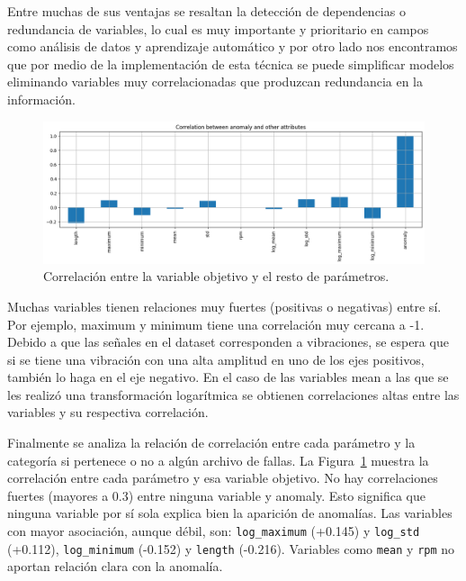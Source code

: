 \documentclass[11pt,a4paper,spanish]{book}
\numberwithin{equation}{chapter}
\numberwithin{figure}{chapter}
\begin{document}
Entre muchas de sus ventajas se resaltan la detección de dependencias o redundancia de 
variables, lo cual es muy importante y prioritario en campos como análisis de datos y 
aprendizaje automático y por otro lado nos encontramos que por medio de la implementación
de esta técnica se puede simplificar modelos eliminando variables muy correlacionadas que 
produzcan redundancia en la información. \cite{Alvarez2023}


\begin{figure}[h]
    \centering
    \includegraphics[width=1\textwidth]{media/dataset/corr-mat-target.png}
    \caption{Correlación entre la variable objetivo y el resto de parámetros.}
    \label{fig:figCorrMatTarget}
\end{figure}



Muchas variables tienen relaciones muy fuertes (positivas o negativas) entre sí. 
Por ejemplo,  maximum y minimum tiene una correlación muy cercana a -1. 
Debido a que las señales en el dataset corresponden a vibraciones, se espera que si se 
tiene una vibración con una alta amplitud en uno de los ejes positivos, 
también lo haga en el eje negativo. En el caso de las variables mean a las que se les 
realizó una transformación logarítmica se obtienen correlaciones altas entre 
las variables y su respectiva correlación. 


Finalmente se analiza la relación de correlación entre cada parámetro y la categoría si 
pertenece o no a algún archivo de fallas. La Figura~\ref{fig:figCorrMatTarget} muestra 
la correlación entre cada parámetro y esa variable objetivo. No hay correlaciones fuertes
(mayores a 0.3) entre ninguna variable y anomaly. 
Esto significa que ninguna variable por sí sola explica bien la aparición de anomalías. 
Las variables con mayor asociación, aunque débil, son: \lstinline|log_maximum| (+0.145) y 
\lstinline|log_std| (+0.112), \lstinline|log_minimum| (-0.152) y \lstinline|length| (-0.216).
Variables como \lstinline|mean| y \lstinline|rpm| no aportan relación clara con la anomalía.
\end{document}
